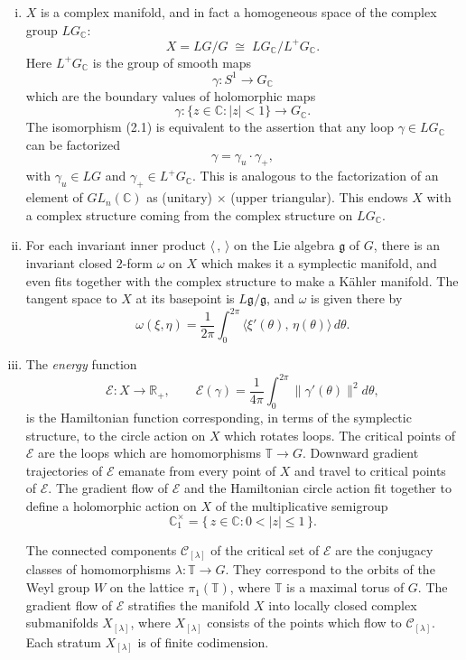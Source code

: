 \documentclass[12pt]{article}
\begin{document}
\begin{enumerate}[(i)]
\item
\(X\) is a complex manifold, and in fact a homogeneous space of the complex group \(LG_{\mathbb{C}}\):
\[
X = LG/G \;\cong\; LG_{\mathbb{C}} / L^+G_{\mathbb{C}}. \tag{2.1}
\]
Here \(L^+G_{\mathbb{C}}\) is the group of smooth maps 
\[
\gamma : S^1 \longrightarrow G_{\mathbb{C}}
\]
which are the boundary values of holomorphic maps
\[
\gamma : \{ z \in \mathbb{C} : |z| < 1 \} \longrightarrow G_{\mathbb{C}}.
\]
The isomorphism (2.1) is equivalent to the assertion that any loop 
\(\gamma \in LG_{\mathbb{C}}\) can be factorized
\[
\gamma = \gamma_u \cdot \gamma_+,
\]
with \(\gamma_u \in LG\) and \(\gamma_+ \in L^+G_{\mathbb{C}}\).  
This is analogous to the factorization of an element of \(GL_n(\mathbb{C})\) as 
(unitary) \(\times\) (upper triangular). This endows \(X\) with a complex structure coming from the complex structure on \(LG_{\mathbb{C}}\).

\item
For each invariant inner product \(\langle\, , \,\rangle\) on the Lie algebra \(\mathfrak{g}\) of \(G\),
there is an invariant closed \(2\)-form \(\omega\) on \(X\) which makes it a symplectic manifold, and even fits together with the complex structure to make a Kähler manifold.  
The tangent space to \(X\) at its basepoint is \(L\mathfrak{g}/\mathfrak{g}\),
and \(\omega\) is given there by
\[
\omega(\xi, \eta)
= \frac{1}{2\pi} \int_0^{2\pi} \langle \xi'(\theta),\, \eta(\theta) \rangle\, d\theta.
\tag{2.2}
\]
\item
The \emph{energy} function
\[
\mathcal{E} : X \longrightarrow \mathbb{R}_+, \qquad
\mathcal{E}(\gamma)
= \frac{1}{4\pi} \int_0^{2\pi} \bigl\| \gamma'(\theta) \bigr\|^2 d\theta,
\]
is the Hamiltonian function corresponding, in terms of the symplectic structure,
to the circle action on \(X\) which rotates loops.
The critical points of \(\mathcal{E}\) are the loops which are homomorphisms
\(\mathbb{T} \to G\).
Downward gradient trajectories of \(\mathcal{E}\) emanate from every point of \(X\)
and travel to critical points of \(\mathcal{E}\).
The gradient flow of \(\mathcal{E}\) and the Hamiltonian circle action fit together
to define a holomorphic action on \(X\) of the multiplicative semigroup
\[
\mathbb{C}_1^{\times} = \{\, z \in \mathbb{C} : 0 < |z| \le 1 \,\}.
\]

The connected components \(\mathcal{C}_{[\lambda]}\) of the critical set of \(\mathcal{E}\)
are the conjugacy classes of homomorphisms
\(\lambda : \mathbb{T} \to G\).
They correspond to the orbits of the Weyl group \(W\) on the lattice
\(\pi_1(\mathbb{T})\), where \(\mathbb{T}\) is a maximal torus of \(G\).
The gradient flow of \(\mathcal{E}\) stratifies the manifold \(X\)
into locally closed complex submanifolds \(X_{[\lambda]}\),
where \(X_{[\lambda]}\) consists of the points which flow to \(\mathcal{C}_{[\lambda]}\).
Each stratum \(X_{[\lambda]}\) is of finite codimension. 
\begin{proposition}
    

\end{proposition}
\end{enumerate}
\end{document}
